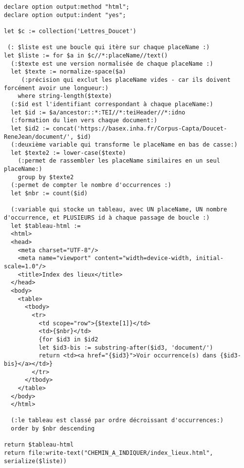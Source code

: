 \begin{verbatim}
declare option output:method "html";
declare option output:indent "yes";

let $c := collection('Lettres_Doucet')

 (: $liste est une boucle qui itère sur chaque placeName :)
let $liste := for $a in $c//*:placeName//text()
  (:$texte est une version normalisée de chaque placeName :)
  let $texte := normalize-space($a) 
     (:précision qui exclut les placeName vides - car ils doivent forcément avoir une longueur:)
    where string-length($texte)
  (:$id est l'identifiant correspondant à chaque placeName:) 
  let $id := $a/ancestor::*:TEI//*:teiHeader//*:idno 
  (:formation du lien vers chaque document:)
  let $id2 := concat('https://basex.inha.fr/Corpus-Capta/Doucet-ReneJean/document/', $id) 
  (:deuxième variable qui transforme le placeName en bas de casse:)
  let $texte2 := lower-case($texte)
    (:permet de rassembler les placeName similaires en un seul placeName:)
    group by $texte2 
  (:permet de compter le nombre d'occurrences :)
  let $nbr := count($id) 
  
  (:variable qui stocke un tableau, avec UN placeName, UN nombre d'occurrence, et PLUSIEURS id à chaque passage de boucle :)
  let $tableau-html := 
  <html>
  <head>
    <meta charset="UTF-8"/>
    <meta name="viewport" content="width=device-width, initial-scale=1.0"/>
    <title>Index des lieux</title>
  </head>
  <body>
    <table>  
      <tbody>   
        <tr>
          <td scope="row">{$texte[1]}</td>
          <td>{$nbr}</td>
          {for $id3 in $id2 
          let $id3-bis := substring-after($id3, 'document/')
          return <td><a href="{$id3}">Voir occurrence(s) dans {$id3-bis}</a></td>}
        </tr>   
      </tbody>
    </table>
  </body>
  </html>
  
  (:le tableau est classé par ordre décroissant d'occurrences:)
  order by $nbr descending 
  
return $tableau-html
return file:write-text("CHEMIN_A_INDIQUER/index_lieux.html", serialize($liste))
\end{verbatim}